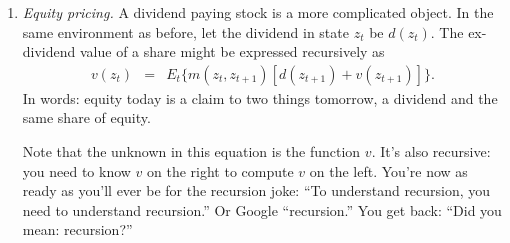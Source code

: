 \documentclass[11pt]{article}
\begin{document}
\begin{enumerate}
\begin{comment}
Another class of tractable models is based on finite-state Markov chains:
$z_t$ takes on a finite number of values, say $i = 1,\ldots, I$.
Then the function $q^n(z_t)$ is a vector, say $q^n$,
with one element for every state.
By tradition, we collect the conditional (``transition'') probabilities
in a matrix $P = [p_{ij}]$,
where $p_{ij}$ is the probability that $z_{t+1} = j$ given that $z_t = i$.
Similarly, the pricing kernel is a matrix of elements $[m_{ij}]$.

In this setting, a one-period bond price in state $i$ is
\begin{eqnarray*}
    q^1_i &=& \sum_j p_{ij} m_{ij} .
\end{eqnarray*}
If we define the matrix $B = [b_{ij}] = [p_{ij} m_{ij}]$,
then in matrix terms, the one-period bond price function/vector is
\begin{eqnarray*}
    q^1 &=& B q^0 ,
\end{eqnarray*}
where $q^0$ is a vector of ones ---
the prices of 0-maturity bonds, namely one.
 Other bond prices follow recursively:
\begin{eqnarray*}
    q^{n+1} &=& B q^n .
\end{eqnarray*}
You should convince yourself that this is (\ref{eq:recursion-bond})
applied to this environment.
If we substitute, we see that $q^n = B^n q^0 $, so anything we know
about powers of positive matrices can be put to work.
\end{comment}

\item {\it Equity pricing.\/}
A dividend paying stock is a more complicated object.
In the same environment as before, let the dividend in state $z_t$ be $d(z_t)$.
The ex-dividend value of a share might be expressed recursively as
\begin{eqnarray}
    v(z_t) &=& E_t \big\{ m(z_t,z_{t+1}) [d(z_{t+1}) + v(z_{t+1})] \big\} .
    \label{eq:recursion-equity}
\end{eqnarray}
In words:  equity today is a claim to two things tomorrow,
a dividend and the same share of equity.

Note that the unknown in this equation is the function $v$.
It's also recursive:  you need to know $v$ on the right to compute $v$ on the left.
You're now as ready as you'll ever be for the recursion joke:
``To understand recursion, you need to understand recursion.''
Or Google ``recursion.'' You get back:  ``Did you mean: recursion?''


\end{enumerate}
\end{document}
